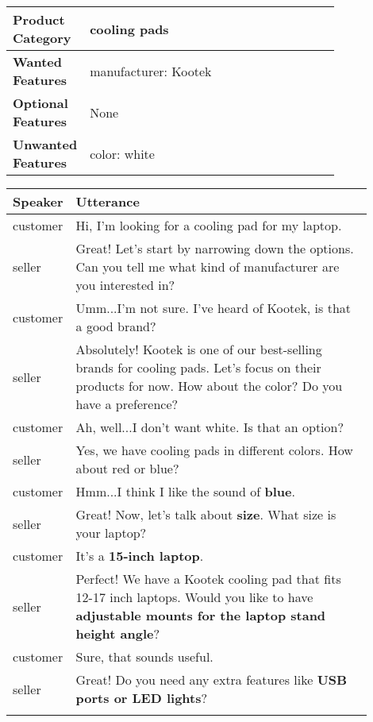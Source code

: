 \begin{table*}[t]
\small
\begin{center}

    \begin{tabular}{l p{0.82\linewidth} }
    \hline
    \textbf{Product Category} & cooling pads \\ \hline
    \textbf{Wanted Features} & manufacturer: Kootek \\ \hline
    \textbf{Optional Features} & None\\ \hline
    \textbf{Unwanted Features} & color: white \\ \hline 
    \end{tabular}

    \begin{tabular}{l p{0.9\linewidth} }
    \hline
    \textbf{Speaker} & \textbf{Utterance} \\
    \hline
customer& Hi, I'm looking for a cooling pad for my laptop.\\\hdashline
seller& Great! Let's start by narrowing down the options. Can you tell me what kind of manufacturer are you interested in?\\\hdashline
customer& Umm...I'm not sure. I've heard of Kootek, is that a good brand?\\\hdashline
seller& Absolutely! Kootek is one of our best-selling brands for cooling pads. Let's focus on their products for now. How about the color? Do you have a preference?\\\hdashline
customer & Ah, well...I don't want white. Is that an option?\\\hdashline
seller& Yes, we have cooling pads in different colors. How about red or blue?\\\hdashline
customer & Hmm...I think I like the sound of \textbf{blue}.\\\hdashline
seller & Great! Now, let's talk about \textbf{size}. What size is your laptop?\\\hdashline
customer & It's a \textbf{15-inch laptop}.\\\hdashline
seller & Perfect! We have a Kootek cooling pad that fits 12-17 inch laptops. Would you like to have \textbf{adjustable mounts for the laptop stand height angle}?\\\hdashline
customer & Sure, that sounds useful.\\\hdashline
seller & Great! Do you need any extra features like \textbf{USB ports or LED lights}?\\\hdashline

\end{tabular}
\end{center}
\end{table*}
